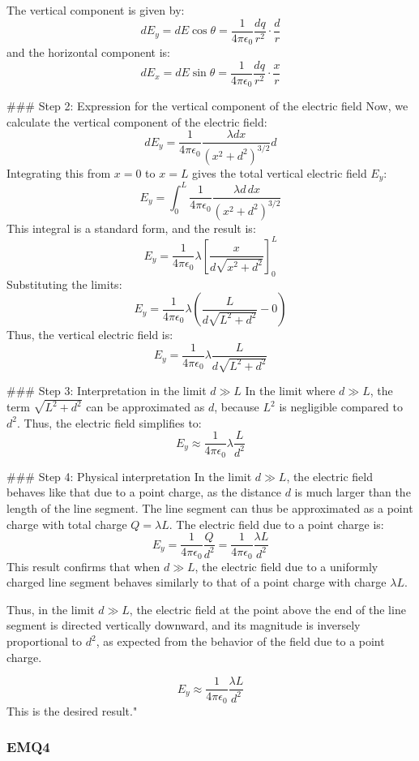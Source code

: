 The vertical component is given by:
\[
dE_y = dE \cos \theta = \frac{1}{4 \pi \epsilon_0} \frac{dq}{r^2} \cdot \frac{d}{r}
\]
and the horizontal component is:
\[
dE_x = dE \sin \theta = \frac{1}{4 \pi \epsilon_0} \frac{dq}{r^2} \cdot \frac{x}{r}
\]

### Step 2: Expression for the vertical component of the electric field
Now, we calculate the vertical component of the electric field:
\[
dE_y = \frac{1}{4 \pi \epsilon_0} \frac{\lambda dx}{(x^2 + d^2)^{3/2}} d
\]
Integrating this from \( x = 0 \) to \( x = L \) gives the total vertical electric field \( E_y \):
\[
E_y = \int_0^L \frac{1}{4 \pi \epsilon_0} \frac{\lambda d \, dx}{(x^2 + d^2)^{3/2}}
\]
This integral is a standard form, and the result is:
\[
E_y = \frac{1}{4 \pi \epsilon_0} \lambda \left[ \frac{x}{d \sqrt{x^2 + d^2}} \right]_0^L
\]
Substituting the limits:
\[
E_y = \frac{1}{4 \pi \epsilon_0} \lambda \left( \frac{L}{d \sqrt{L^2 + d^2}} - 0 \right)
\]
Thus, the vertical electric field is:
\[
E_y = \frac{1}{4 \pi \epsilon_0} \lambda \frac{L}{d \sqrt{L^2 + d^2}}
\]

### Step 3: Interpretation in the limit \( d \gg L \)
In the limit where \( d \gg L \), the term \( \sqrt{L^2 + d^2} \) can be approximated as \( d \), because \( L^2 \) is negligible compared to \( d^2 \). Thus, the electric field simplifies to:
\[
E_y \approx \frac{1}{4 \pi \epsilon_0} \lambda \frac{L}{d^2}
\]

### Step 4: Physical interpretation
In the limit \( d \gg L \), the electric field behaves like that due to a point charge, as the distance \( d \) is much larger than the length of the line segment. The line segment can thus be approximated as a point charge with total charge \( Q = \lambda L \). The electric field due to a point charge is:
\[
E_y = \frac{1}{4 \pi \epsilon_0} \frac{Q}{d^2} = \frac{1}{4 \pi \epsilon_0} \frac{\lambda L}{d^2}
\]
This result confirms that when \( d \gg L \), the electric field due to a uniformly charged line segment behaves similarly to that of a point charge with charge \( \lambda L \).

Thus, in the limit \( d \gg L \), the electric field at the point above the end of the line segment is directed vertically downward, and its magnitude is inversely proportional to \( d^2 \), as expected from the behavior of the field due to a point charge.

\[
E_y \approx \frac{1}{4 \pi \epsilon_0} \frac{\lambda L}{d^2}
\]
This is the desired result."


\subsubsection{EMQ4}

